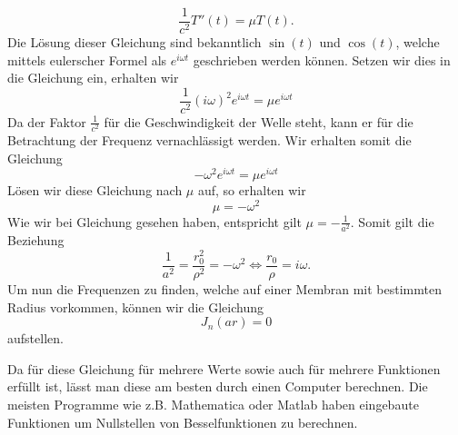 \begin{equation}
\frac{1}{c^2} T''(t) = \mu T(t).
\end{equation} 
Die Lösung dieser Gleichung sind bekanntlich $\sin(t)$ und $\cos(t)$, welche mittels eulerscher Formel als $e^{i\omega t}$ geschrieben werden können.
Setzen wir dies in die Gleichung ein, erhalten wir
\begin{equation}
\frac{1}{c^2}(i\omega)^2 e^{i\omega t} = \mu e^{i\omega t}
\end{equation}
Da der Faktor $\frac{1}{c^2}$ für die Geschwindigkeit der Welle steht, kann er für die Betrachtung der Frequenz vernachlässigt werden. Wir erhalten somit die Gleichung
\begin{equation}
-\omega^2 e^{i\omega t} = \mu e^{i\omega t}
\end{equation}
Lösen wir diese Gleichung nach $\mu$ auf, so erhalten wir
\begin{equation}
\mu = -\omega^2
\end{equation}
Wie wir bei Gleichung  gesehen haben, entspricht gilt $\mu = -\frac{1}{a^2}$. Somit gilt die Beziehung
\begin{equation}
\frac{1}{a^2} = \frac{r_0^2}{\rho^2} = -\omega^2
\Leftrightarrow
\frac{r_0}{\rho} = i\omega.
\end{equation}
Um nun die Frequenzen zu finden, welche auf einer Membran mit bestimmten Radius vorkommen, können wir die Gleichung
\begin{equation}
J_n(ar) = 0
\end{equation}
aufstellen.

Da für diese Gleichung für mehrere Werte sowie auch für mehrere Funktionen erfüllt ist, lässt man diese am besten durch einen Computer berechnen. Die meisten Programme wie z.B. Mathematica oder Matlab haben eingebaute Funktionen um Nullstellen von Besselfunktionen zu berechnen.

